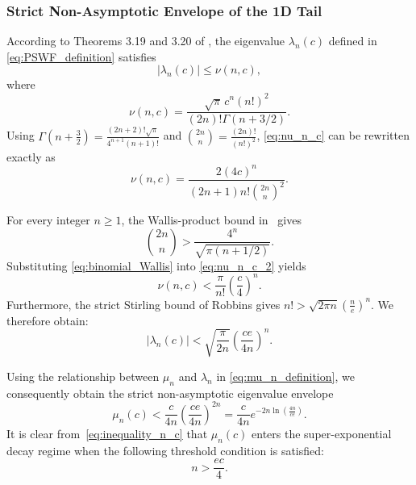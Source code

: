 \documentclass[lettersize,journal]{IEEEtran}
\theoremstyle{plain}
\begin{document}
\subsubsection{Strict Non-Asymptotic Envelope of the 1D Tail}

According to Theorems 3.19 and 3.20 of
\cite{osipov2013prolate}, the eigenvalue $\lambda_n(c)$ defined
in \eqref{eq:PSWF_definition} satisfies
$$
	|\lambda_n(c)|
	\leq
	\nu(n,c),
$$
where
\begin{equation}
	\nu(n,c)
	=
	\frac{\sqrt{\pi}\,c^n(n!)^2}
	{(2n)!\Gamma(n+3/2)}.
	\label{eq:nu_n_c}
\end{equation}
Using $\Gamma\left(n+\frac{3}{2}\right)=\frac{(2n+2)!\sqrt{\pi}}{4^{n+1}(n+1)!}$
and $\binom{2n}{n}=\frac{(2n)!}{(n!)^2}$,
\eqref{eq:nu_n_c} can be rewritten exactly as
\begin{equation}
	\nu(n,c)
	=
	\frac{2(4c)^n}
	{(2n+1)n!\binom{2n}{n}^{2}}.
	\label{eq:nu_n_c_2}
\end{equation}

For every integer $n\geq1$, 
the Wallis-product bound
in~\cite[Eq.~(3)]{Hirschhorn2015WallissPA} gives
\begin{equation}
	\binom{2n}{n}
	>
	\frac{4^n}
	{\sqrt{\pi(n+1/2)}}.
	\label{eq:binomial_Wallis}
\end{equation}
Substituting \eqref{eq:binomial_Wallis} into
\eqref{eq:nu_n_c_2} yields
$$
	\nu(n,c)
	<
	\frac{\pi}{n!}
	\left(\frac{c}{4}\right)^n.
	\label{nu_n_c_upperbound}
$$
Furthermore, the strict Stirling bound of Robbins
\cite{robbins1955remark} gives $n! > \sqrt{2\pi n}\left(\frac{n}{e}\right)^n$.
We therefore obtain:
$$
	|\lambda_n(c)|
	<
	\sqrt{\frac{\pi}{2n}}
	\left(\frac{ce}{4n}\right)^n.
	\label{lambda_n_upperbound}
$$

Using the relationship between $\mu_n$ and $\lambda_n$ in
\eqref{eq:mu_n_definition}, we consequently obtain the strict
non-asymptotic eigenvalue envelope
\begin{equation}
	\mu_n(c)
	<
	\frac{c}{4n}
	\left(\frac{ce}{4n}\right)^{2n}
	=
	\frac{c}{4n}
	e^{-2n\ln\left(\frac{4n}{ce}\right)}.
	\label{eq:inequality_n_c}
\end{equation}
It is clear from~\eqref{eq:inequality_n_c} that $\mu_n(c)$ enters the super-exponential decay regime when the following threshold condition is satisfied:
$$
	n > \frac{ec}{4}.
	\label{eq:n_threshold}
$$
\end{document}
